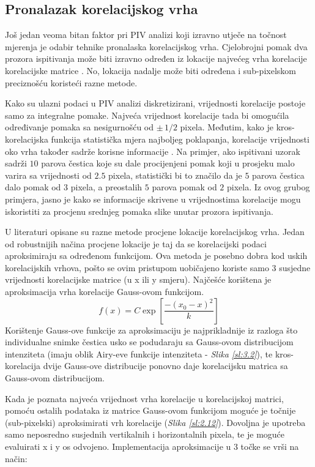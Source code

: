 \subsection{Pronalazak korelacijskog vrha}
Još jedan veoma bitan faktor pri PIV analizi koji izravno utječe na točnost mjerenja je odabir tehnike pronalaska korelacijskog vrha. Cjelobrojni pomak dva prozora ispitivanja može biti izravno određen iz lokacije najvećeg vrha korelacije korelacijske matrice \cite{thielicke2014_article}. No, lokacija nadalje može biti određena i sub-pixelskom preciznošću koristeći razne metode.
\par
Kako su ulazni podaci u PIV analizi diskretizirani, vrijednosti korelacije postoje samo za integralne pomake. Najveća vrijednost korelacije tada bi omogućila određivanje pomaka sa nesigurnošću od $\pm \, 1/2$ pixela. Međutim, kako je kros-korelacijska funkcija statistička mjera najboljeg poklapanja, korelacije vrijednosti oko vrha također sadrže korisne informacije \cite{raffel2018_book}. Na primjer, ako ispitivani uzorak sadrži $10$ parova čestica koje su dale procijenjeni pomak koji u prosjeku malo varira sa vrijednosti od $2.5$ pixela, statistički bi to značilo da je $5$ parova čestica dalo pomak od $3$ pixela, a preostalih $5$ parova pomak od $2$ pixela. Iz ovog grubog primjera, jasno je kako se informacije skrivene u vrijednostima korelacije mogu iskoristiti za procjenu srednjeg pomaka slike unutar prozora ispitivanja.
\par
U literaturi \cite{raffel2018_book} opisane su razne metode procjene lokacije korelacijskog vrha. Jedan od robustnijih načina procjene lokacije je taj da se korelacijski podaci aproksimiraju sa određenom funkcijom. Ova metoda je posebno dobra kod uskih korelacijskih vrhova, pošto se ovim pristupom uobičajeno koriste samo 3 susjedne vrijednosti korelacijske matrice (u x ili y smjeru). Najčešće korištena je aproksimacija vrha korelacije Gauss-ovom funkcijom. 
\begin{equation}
	f(x)=C\exp \left[\dfrac{-(x_{0}-x)^{2}}{k}\right]
	\label{eqn:2.7}
\end{equation}
Korištenje Gauss-ove funkcije za aproksimaciju je najprikladnije iz razloga što individualne snimke čestica usko se podudaraju sa Gauss-ovom distribucijom intenziteta (imaju oblik Airy-eve funkcije intenziteta - \textit{Slika \ref{sl:3.2}}), te kros-korelacija dvije Gauss-ove distribucije ponovno daje korelacijsku matrica sa Gauss-ovom distribucijom.
\par
Kada je poznata najveća vrijednost vrha korelacije u korelacijskoj matrici, pomoću ostalih podataka iz matrice Gauss-ovom funkcijom moguće je točnije (sub-pixelski) aproksimirati vrh korelacije (\textit{Slika \ref{sl:2.12}}). Dovoljna je upotreba samo neposredno susjednih vertikalnih i horizontalnih pixela, te je moguće evaluirati x i y os odvojeno. Implementacija aproksimacije u 3 točke se vrši na način:
